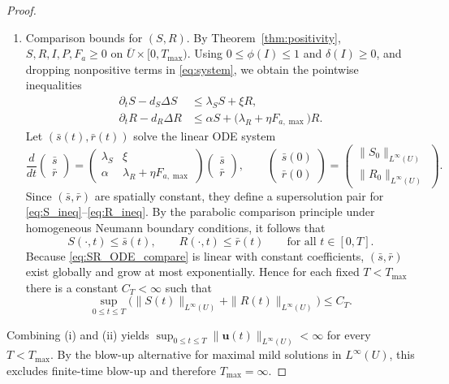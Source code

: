 \documentclass[pdflatex,sn-mathphys-ay]{sn-jnl}
\theoremstyle{thmstyleone}
\theoremstyle{definition}
\theoremstyle{remark}
\begin{document}
\begin{proof}
\begin{enumerate}[label=(\roman*)]
\item Comparison bounds for $(S,R)$.
By Theorem~\ref{thm:positivity}, $S,R,I,P,F_a\ge0$ on $\overline U\times[0,T_{\max})$. 
Using $0\le \phi(I)\le 1$ and $\delta(I)\ge0$, and dropping nonpositive terms in \eqref{eq:system}, we obtain the pointwise inequalities
\begin{align}
\label{eq:S_ineq}
\partial_t S-d_S\Delta S &\le \lambda_S S + \xi R,
\\[4pt]
\label{eq:R_ineq}
\partial_t R-d_R\Delta R &\le \alpha S + \bigl(\lambda_R+\eta F_{a,\max}\bigr)R.
\end{align}
Let $(\bar s(t),\bar r(t))$ solve the linear ODE system
\begin{equation}
\label{eq:SR_ODE_compare}
\frac{d}{dt}
\begin{pmatrix}
\bar s\\ \bar r
\end{pmatrix}
=
\begin{pmatrix}
\lambda_S & \xi\\[2pt]
\alpha & \lambda_R+\eta F_{a,\max}
\end{pmatrix}
\begin{pmatrix}
\bar s\\ \bar r
\end{pmatrix},
\qquad
\begin{pmatrix}
\bar s(0)\\ \bar r(0)
\end{pmatrix}
=
\begin{pmatrix}
\|S_0\|_{L^\infty(U)}\\[2pt] \|R_0\|_{L^\infty(U)}
\end{pmatrix}.
\end{equation}
Since $(\bar s,\bar r)$ are spatially constant, they define a supersolution pair for \eqref{eq:S_ineq}--\eqref{eq:R_ineq}. 
By the parabolic comparison principle under homogeneous Neumann boundary conditions, it follows that
\[
S(\cdot,t)\le \bar s(t),\qquad R(\cdot,t)\le \bar r(t)\qquad \text{for all }t\in[0,T].
\]
Because \eqref{eq:SR_ODE_compare} is linear with constant coefficients, $(\bar s,\bar r)$ exist globally and grow at most exponentially. 
Hence for each fixed $T<T_{\max}$ there is a constant $C_T<\infty$ such that
\[
\sup_{0\le t\le T}\bigl(\|S(t)\|_{L^\infty(U)}+\|R(t)\|_{L^\infty(U)}\bigr)\le C_T.
\]
\end{enumerate}

Combining (i) and (ii) yields $\sup_{0\le t\le T}\|\mathbf{u}(t)\|_{L^\infty(U)}<\infty$ for every $T<T_{\max}$. 
By the blow-up alternative for maximal mild solutions in $L^\infty(U)$, this excludes finite-time blow-up and therefore $T_{\max}=\infty$.
\end{proof}
\end{document}
